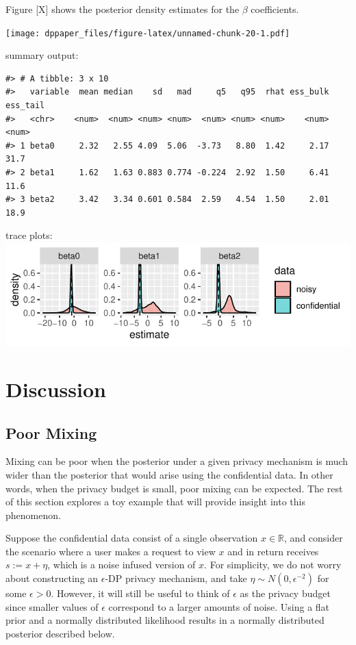 Figure {[}X{]} shows the posterior density estimates for the \(\beta\) coefficients.

\texttt{[image: dppaper\_files/figure-latex/unnamed-chunk-20-1.pdf]}

summary output:

\begin{verbatim}
#> # A tibble: 3 x 10
#>   variable  mean median    sd   mad     q5   q95  rhat ess_bulk ess_tail
#>   <chr>    <num>  <num> <num> <num>  <num> <num> <num>    <num>    <num>
#> 1 beta0     2.32   2.55 4.09  5.06  -3.73   8.80  1.42     2.17     31.7
#> 2 beta1     1.62   1.63 0.883 0.774 -0.224  2.92  1.50     6.41     11.6
#> 3 beta2     3.42   3.34 0.601 0.584  2.59   4.54  1.50     2.01     18.9
\end{verbatim}

trace plots:
\includegraphics{dppaper_files/figure-latex/unnamed-chunk-22-1.pdf}

\hypertarget{discussion}{%
\section{Discussion}\label{discussion}}

\hypertarget{poor-mixing}{%
\subsection{Poor Mixing}\label{poor-mixing}}

Mixing can be poor when the posterior under a given privacy mechanism is
much wider than the posterior that would arise using the confidential data. In
other words, when the privacy budget is small, poor mixing can be expected. The
rest of this section explores a toy example that will provide insight into this
phenomenon.

Suppose the confidential data consist of a single observation \(x \in \mathbb{R}\),
and consider the scenario where a user makes a request to view \(x\) and
in return receives \(s := x + \eta\), which is a noise infused version of \(x\).
For simplicity, we do not worry about constructing an \(\epsilon\)-DP privacy mechanism,
and take \(\eta \sim N(0, \epsilon^{-2})\) for some \(\epsilon > 0\). However, it
will still be useful to think of \(\epsilon\) as the privacy budget since smaller values
of \(\epsilon\) correspond to a larger amounts of noise. Using
a flat prior and a normally distributed likelihood results in
a normally distributed posterior described below.

